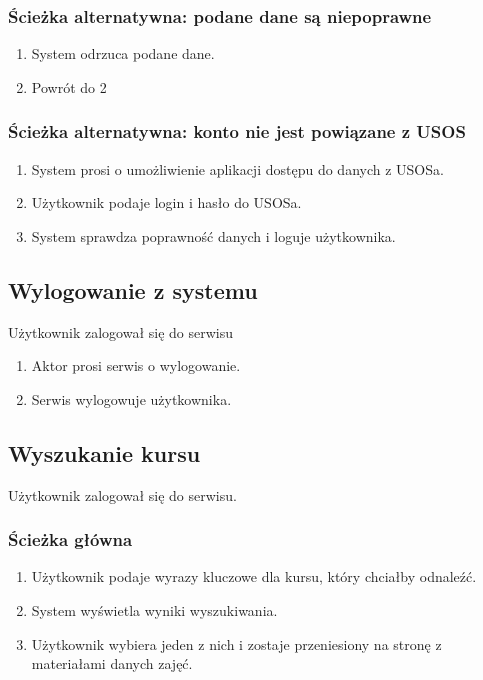 \documentclass{pracamgr}
\begin{document}
\subsubsection{Ścieżka alternatywna: podane dane są niepoprawne}

\begin{enumerate}
   \item System odrzuca podane dane.
   \item Powrót do 2
\end{enumerate}

\subsubsection{Ścieżka alternatywna: konto nie jest powiązane z USOS}

\begin{enumerate}
   \item System prosi o umożliwienie aplikacji dostępu do danych z USOSa.
   \item Użytkownik podaje login i hasło do USOSa.
   \item System sprawdza poprawność danych i loguje użytkownika.
\end{enumerate}

\subsection{Wylogowanie z systemu}

Użytkownik zalogował się do serwisu

\begin{enumerate}
   \item Aktor prosi serwis o wylogowanie.
   \item Serwis wylogowuje użytkownika.
\end{enumerate}

\subsection{Wyszukanie kursu}

Użytkownik zalogował się do serwisu.

\subsubsection{Ścieżka główna}

\begin{enumerate}
   \item Użytkownik podaje wyrazy kluczowe dla kursu, który chciałby odnaleźć.
   \item System wyświetla wyniki wyszukiwania.
   \item Użytkownik wybiera jeden z nich i zostaje przeniesiony na stronę 
      z materiałami danych zajęć.
\end{enumerate}
\end{document}
